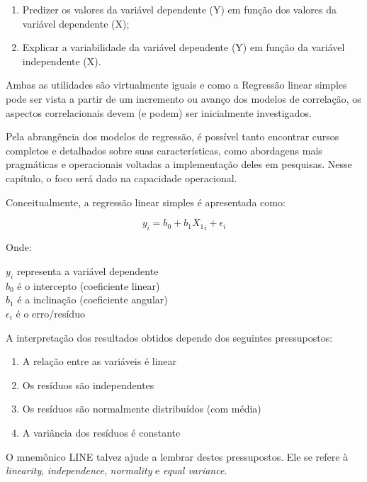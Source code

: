 \documentclass[
]{book}
\providecommand{\tightlist}{%
  \setlength{\itemsep}{0pt}\setlength{\parskip}{0pt}}
\begin{document}
\begin{enumerate}
\def\labelenumi{(\roman{enumi})}
\tightlist
\item
  Predizer os valores da variável dependente (Y) em função dos valores da variável dependente (X);\\
\item
  Explicar a variabilidade da variável dependente (Y) em função da variável independente (X).
\end{enumerate}

Ambas as utilidades são virtualmente iguais e como a Regressão linear simples pode ser vista a partir de um incremento ou avanço dos modelos de correlação, os aspectos correlacionais devem (e podem) ser inicialmente investigados.

Pela abrangência dos modelos de regressão, é possível tanto encontrar cursos completos e detalhados sobre suas características, como abordagens mais pragmáticas e operacionais voltadas a implementação deles em pesquisas. Nesse capítulo, o foco será dado na capacidade operacional.

Conceitualmente, a regressão linear simples é apresentada como:

\[y_i = b_0 + b_1X{_1}_i + \epsilon_{i}\]

Onde:

\(y_i\) representa a variável dependente\\
\(b_0\) é o intercepto (coeficiente linear)\\
\(b_1\) é a inclinação (coeficiente angular)\\
\(\epsilon_{i}\) é o erro/resíduo

A interpretação dos resultados obtidos depende dos seguintes pressupostos:

\begin{enumerate}
\def\labelenumi{(\roman{enumi})}
\tightlist
\item
  A relação entre as variáveis é linear
\item
  Os resíduos são independentes\\
\item
  Os resíduos são normalmente distribuídos (com média)\\
\item
  A variância dos resíduos é constante
\end{enumerate}

O mnemônico LINE talvez ajude a lembrar destes pressupostos. Ele se refere à \emph{linearity}, \emph{independence}, \emph{normality} e \emph{equal variance}.
\end{document}
